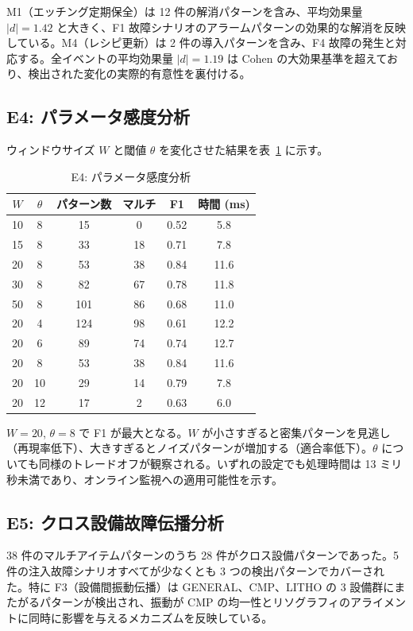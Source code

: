 \documentclass[11pt]{article}
\begin{document}
M1（エッチング定期保全）は 12 件の解消パターンを含み、平均効果量 $|d|=1.42$ と大きく、F1 故障シナリオのアラームパターンの効果的な解消を反映している。M4（レシピ更新）は 2 件の導入パターンを含み、F4 故障の発生と対応する。全イベントの平均効果量 $|d|=1.19$ は Cohen の大効果基準を超えており、検出された変化の実際的有意性を裏付ける。

\subsection{E4: パラメータ感度分析}

ウィンドウサイズ $W$ と閾値 $\theta$ を変化させた結果を表~\ref{tab:e3_sensitivity} に示す。

\begin{table}[t]
\centering
\caption{E4: パラメータ感度分析}
\label{tab:e3_sensitivity}
\begin{tabular}{cccccc}
\toprule
$W$ & $\theta$ & パターン数 & マルチ & F1 & 時間 (ms) \\
\midrule
10 & 8 & 15 & 0 & 0.52 & 5.8 \\
15 & 8 & 33 & 18 & 0.71 & 7.8 \\
20 & 8 & 53 & 38 & 0.84 & 11.6 \\
30 & 8 & 82 & 67 & 0.78 & 11.8 \\
50 & 8 & 101 & 86 & 0.68 & 11.0 \\
\midrule
20 & 4 & 124 & 98 & 0.61 & 12.2 \\
20 & 6 & 89 & 74 & 0.74 & 12.7 \\
20 & 8 & 53 & 38 & 0.84 & 11.6 \\
20 & 10 & 29 & 14 & 0.79 & 7.8 \\
20 & 12 & 17 & 2 & 0.63 & 6.0 \\
\bottomrule
\end{tabular}
\end{table}

$W=20$, $\theta=8$ で F1 が最大となる。$W$ が小さすぎると密集パターンを見逃し（再現率低下）、大きすぎるとノイズパターンが増加する（適合率低下）。$\theta$ についても同様のトレードオフが観察される。いずれの設定でも処理時間は 13 ミリ秒未満であり、オンライン監視への適用可能性を示す。

\subsection{E5: クロス設備故障伝播分析}

38 件のマルチアイテムパターンのうち 28 件がクロス設備パターンであった。5 件の注入故障シナリオすべてが少なくとも 3 つの検出パターンでカバーされた。特に F3（設備間振動伝播）は GENERAL、CMP、LITHO の 3 設備群にまたがるパターンが検出され、振動が CMP の均一性とリソグラフィのアライメントに同時に影響を与えるメカニズムを反映している。
\end{document}
